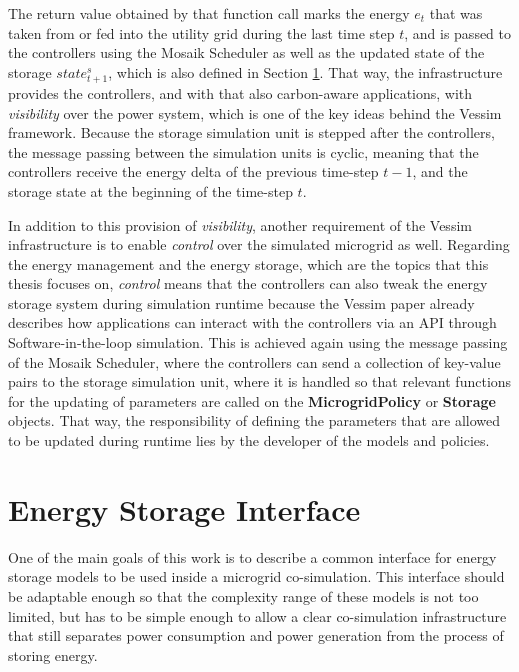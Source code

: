 The return value obtained by that function call marks the energy $e_t$ that was taken from or fed into the utility grid during the last time step $t$, and is passed to the controllers using the Mosaik Scheduler as well as the updated state of the storage $state_{t+1}^s$, which is also defined in Section \ref{energy_storage_interface}. That way, the infrastructure provides the controllers, and with that also carbon-aware applications, with \textit{visibility} over the power system, which is one of the key ideas behind the Vessim framework. Because the storage simulation unit is stepped after the controllers, the message passing between the simulation units is cyclic, meaning that the controllers receive the energy delta of the previous time-step $t-1$, and the storage state at the beginning of the time-step $t$.

In addition to this provision of \textit{visibility}, another requirement of the Vessim infrastructure is to enable \textit{control} over the simulated microgrid as well. Regarding the energy management and the energy storage, which are the topics that this thesis focuses on, \textit{control} means that the controllers can also tweak the energy storage system during simulation runtime because the Vessim paper \cite{vessim} already describes how applications can interact with the controllers via an API through Software-in-the-loop simulation. This is achieved again using the message passing of the Mosaik Scheduler, where the controllers can send a collection of key-value pairs to the storage simulation unit, where it is handled so that relevant functions for the updating of parameters are called on the \textbf{MicrogridPolicy} or \textbf{Storage} objects. That way, the responsibility of defining the parameters that are allowed to be updated during runtime lies by the developer of the models and policies.

\section{Energy Storage Interface}
\label{energy_storage_interface}
One of the main goals of this work is to describe a common interface for energy storage models to be used inside a microgrid co-simulation. This interface should be adaptable enough so that the complexity range of these models is not too limited, but has to be simple enough to allow a clear co-simulation infrastructure that still separates power consumption and power generation from the process of storing energy.


